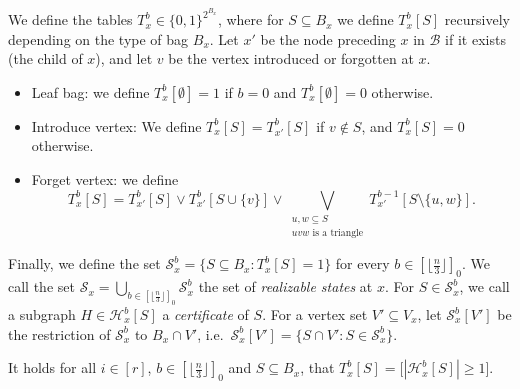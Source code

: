 \documentclass[a4paper,UKenglish,cleveref, autoref, thm-restate]{lipics-v2021}
\begin{document}
\begin{definition}\label{tripack::def:states}
    We define the tables $T_x^b\in\{0,1\}^{2^{B_x}}$, where for $S\subseteq B_x$ we define $T_x^b[S]$ recursively depending on the type of bag $B_x$. Let $x'$ be the node preceding $x$ in $\mathcal{B}$ if it exists (the child of $x$), and let $v$ be the vertex introduced or forgotten at $x$.
    \begin{itemize}
        \item Leaf bag: we define $T_x^b[\emptyset] = 1$ if $b=0$ and $T_x^b[\emptyset] = 0$ otherwise.
        \item Introduce vertex: We define $T_x^b[S] = T_{x'}^b[S]$ if $v\not\in S$, and $T_x^b[S] = 0$ otherwise.
        \item Forget vertex: we define 
        \[
        T_x^b[S] = T_{x'}^b[S] \lor T_{x'}^b[S \cup \{v\}] \lor \bigvee\limits_{
            \substack{u,w\subseteq S\\
            uvw\text{ is a triangle}}} T_{x'}^{b-1}[S\setminus \{u,w\}].\]
    \end{itemize}
    Finally, we define the set $\mathcal{S}_x^b = \{S \subseteq B_x \colon T_x^b[S] = 1\}$ for every $b \in [\lfloor\frac{n}{3}\rfloor]_0$. 
    We call the set $\mathcal{S}_x = \bigcup_{b\in [\lfloor\frac{n}{3}\rfloor]_0} \mathcal{S}_x^b$ the set of \emph{realizable states} at $x$.
    For $S\in \mathcal{S}_x^b$, we call a subgraph $H \in \mathcal{H}_x^b[S]$ a \emph{certificate} of $S$.
    For a vertex set $V' \subseteq V_x$, let $\mathcal{S}_x^b[V']$ be the restriction of $\mathcal{S}_x^b$ to $B_x\cap V'$, i.e.\
    $\mathcal{S}_x^b[V'] = \{S\cap V'\colon S\in\mathcal{S}_x^b\}$.
\end{definition}

\begin{lemma}
    It holds for all $i\in [r]$, $b\in [\lfloor\frac{n}{3}\rfloor]_0$ and $S\subseteq B_x$, that $T_x^b[S] = \big[|\mathcal{H}_x^b[S]|\geq 1\big]$.
\end{lemma}
\end{document}
